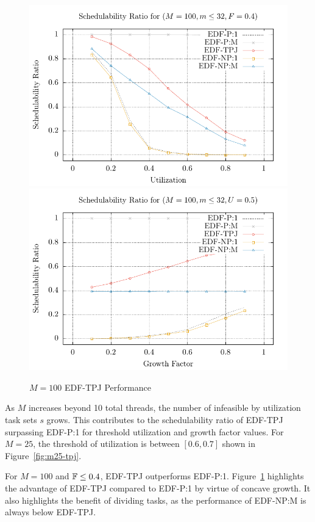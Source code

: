 \documentclass[a4paper,UKenglish,cleveref,autoref,english]{lipics-v2019}
\begin{document}
\begin{figure}[ht]
  \centering
  \includegraphics[width=\cwidth]{plot/2D-UFS/2D-M100m32F0_4xS}\quad
  \includegraphics[width=\cwidth]{plot/2D-UFS/2D-M100m32U0_5xS}%
  \caption{${M = 100}$ EDF-TPJ Performance}
  \label{fig:m100-tpj}
\end{figure}

As ${M}$ increases beyond 10 total threads, the number of infeasible
by utilization task sets ${s}$ grows. This contributes to the
schedulability ratio of EDF-TPJ surpassing EDF-P:1 for
threshold utilization and growth factor values. For ${M = 25}$, the
threshold of utilization is between ${[0.6,0.7]}$ shown in
Figure~\ref{fig:m25-tpj}.

For ${M = 100}$ and ${\mathbb{F} \le 0.4}$, EDF-TPJ outperforms
EDF-P:1. Figure~\ref{fig:m100-tpj} highlights the advantage of
EDF-TPJ compared to EDF-P:1 by virtue of concave growth. It also
highlights the benefit of dividing tasks, as the performance of
EDF-NP:M is always below EDF-TPJ.
\end{document}
